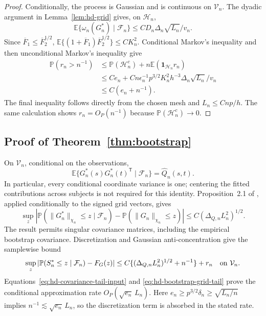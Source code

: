 \documentclass[10pt]{book}
\newcommand{\expect}{\mathbb{E}}
\newcommand{\prob}{\mathbb{P}}
\newcommand{\trans}{{\scriptscriptstyle\mathsf{T}}}
\numberwithin{equation}{section}
\begin{document}
\begin{proof}
Conditionally, the process is Gaussian and is continuous on
$\mathcal V_n$. The dyadic argument in Lemma~\ref{lem:hd-grid} gives,
on $\mathcal H_n$,
\[
 \expect\{\omega_n(G_n^*)\mid\mathcal F_n\}
 \le CD_n\Delta_n\sqrt{L_n}/v_n.
\]
Since $\overline F_1\le\overline F_2^{1/2}$,
$\expect\{(1+\overline F_1)\overline F_2^{1/2}\}
 \le CK_n^2$. Conditional Markov's inequality and then unconditional
Markov's inequality give
\begin{align*}
 \prob(r_n>n^{-1})
 &\le\prob(\mathcal H_n^c)
       +n\expect(\mathbf1_{\mathcal H_n}r_n)\\
 &\le Ce_n+
 Cn\epsilon_n^{-1}p^{3/2}K_n^2h^{-3}\Delta_n\sqrt{L_n}/v_n\\
 &\le C(e_n+n^{-1}).
\end{align*}
The final inequality follows directly from the chosen mesh and
$L_n\le Cnp/h$. The same calculation shows $r_n=O_P(n^{-1})$ because
$\prob(\mathcal H_n^c)\to0$.
\end{proof}

\subsection{Proof of Theorem~\ref{thm:bootstrap}}

On $\mathcal V_n$, conditional on the observations,
\[
 \expect\{G_n^*(s)G_n^*(t)^\trans\mid\mathcal F_n\}
 =\widehat Q_n(s,t).
\]
In particular, every conditional coordinate variance is one; centering
the fitted contributions across subjects is not required for this
identity. Proposition~2.1 of \citet{chernozhukov_et_al_2022}, applied
conditionally to the signed grid vectors, gives
\[
 \sup_z\left|\prob(\|G_n^*\|_{\chi_n}\le z\mid\mathcal F_n)
             -\prob(\|G_n\|_{\chi_n}\le z)\right|
 \le C(\Delta_{Q,n}L_n^2)^{1/2}.
\]
The result permits singular covariance matrices, including the empirical
bootstrap covariance. Discretization and Gaussian anti-concentration
give the samplewise bound
\begin{equation}
 \sup_z|\prob(S_n^*\le z\mid\mathcal F_n)-F_G(z)|
 \le C\{(\Delta_{Q,n}L_n^2)^{1/2}+n^{-1}\}+r_n
 \quad\hbox{on }\mathcal V_n.
 \label{eq:hd-bootstrap-continuous-comparison}
\end{equation}
Equations~\eqref{eq:hd-covariance-tail-input} and
\eqref{eq:hd-bootstrap-grid-tail} prove the conditional approximation
rate $O_P(\sqrt{e_n}\,L_n)$. Here
$e_n\ge p^{3/2}\delta_n\ge\sqrt{L_n/n}$ implies
$n^{-1}\lesssim\sqrt{e_n}\,L_n$, so the discretization term is
absorbed in the stated rate.
\end{document}

